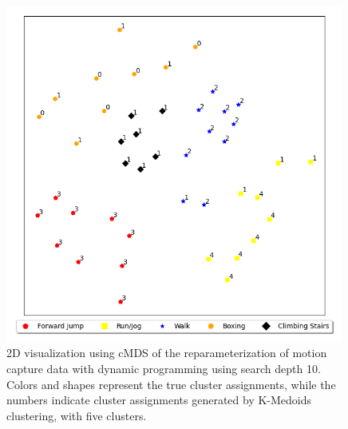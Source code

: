 \begin{figure}
    \centering
    \includegraphics[width=0.99\textwidth]{figures/motion-capture-data/2d_plots/reparameterization_depth10}
    \caption[2D cMDS Visualization of Reparameterized Motion Capture Data (Search Depth 10)]{2D visualization using cMDS of the reparameterization of motion capture data with dynamic programming using search depth 10. Colors and shapes represent the true cluster assignments, while the numbers indicate cluster assignments generated by K-Medoids clustering, with five clusters.}
    \label{fig:2d-reparameterization-depth10}
\end{figure}

